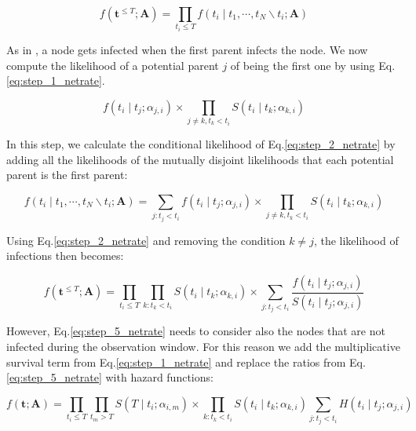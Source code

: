 \begin{equation}\label{eq:step_2_netrate}
f(\textbf{t}^{\leq T};\textbf{A})=\prod_{t_{i}\leq T}f(t_{i}\mid t_{1},\cdots,t_{N}\backslash t_{i};\textbf{A})
\end{equation}

As in \cite{kempe2003maximizing}, a node gets infected when the first parent infects the node. We now compute the likelihood of a potential parent $j$ of being the first one by using Eq.\ref{eq:step_1_netrate}.

\begin{equation}\label{eq:step_3_netrate}
f(t_{i}\mid t_{j};\alpha_{j,i})\times \prod_{j\neq k,t_{k}< t_{i}}S(t_{i}\mid t_{k};\alpha _{k,i})
\end{equation}
 
In this step, we calculate the conditional likelihood of Eq.\ref{eq:step_2_netrate} by adding all the likelihoods of the mutually disjoint likelihoods that each potential parent is the first parent:

\begin{equation}\label{eq:step_4_netrate}
f(t_{i}\mid t_{1},\cdots,t_{N}\backslash t_{i};\textbf{A})=\sum_{j:t_{j}<t_{i}}f(t_{i}\mid t_{j};\alpha _{j,i})\times \prod _{j\neq k,t_{k}<t_{i}}S(t_{i}\mid t_{k};\alpha _{k,i})
\end{equation}

Using Eq.\ref{eq:step_2_netrate} and removing the condition $k\neq j$, the likelihood of infections then becomes:

\begin{equation}\label{eq:step_5_netrate}
f(\textbf{t}^{\leq T};\textbf{A})=\prod_{t_{i}\leq T}\prod_{k:t_{k}<t_{i}}S(t_{i}\mid t_{k};\alpha _{k,i})\times \sum_{j:t_{j}<t_{i}}\frac{f(t_{i}\mid t_{j};\alpha_{j,i})}{S(t_{i}\mid t_{j};\alpha _{j,i})}
\end{equation}

However, Eq.\ref{eq:step_5_netrate} needs to consider also the nodes that are not infected during the observation window. For this reason we add the multiplicative survival term from Eq.\ref{eq:step_1_netrate} and replace the ratios from Eq.\ref{eq:step_5_netrate} with hazard functions:

\begin{equation}\label{eq:step_6_netrate}
f(\textbf{t};\textbf{A})=\prod_{t_{i}\leq T}\prod_{t_{m}>T}S(T\mid t_{i};\alpha_{i,m})\times \prod_{k:t_{k}<t_{i}}S(t_{i}\mid t_{k};\alpha _{k,i})\sum_{j:t_{j}<t_{i}}H(t_{i}\mid t_{j};\alpha _{j,i})
\end{equation}

